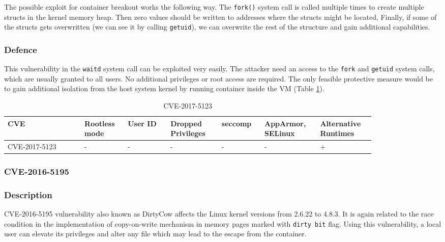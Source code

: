 The possible exploit for container breakout works the following way. The \texttt{fork()} system call is called multiple times to create multiple structs in the kernel memory heap. Then zero values should be written to addresses where the structs might be located, Finally, if some of the structs gets overwritten (we can see it by calling \texttt{getuid}), we can overwrite the rest of the structure and gain additional capabilities.

\subsubsection*{Defence}

This vulnerability in the \texttt{waitd} system call can be exploited very easily. The attacker need an access to the \texttt{fork} and \texttt{getuid} system calls, which are usually granted to all users. No additional privileges or root access are required. The only feasible protective measure would be to gain additional isolation from the host system kernel by running container inside the VM (Table \ref{tab:h:8}).

\begin{table}[H]
    \centering \small
    \begin{tabular}{| p{0.18\linewidth} | p{0.1\linewidth} | p{0.1\linewidth} | p{0.12\linewidth} | p{0.1\linewidth} | p{0.12\linewidth} | p{0.12\linewidth} |} \hline
    CVE & Rootless mode & User ID & Dropped Privileges & seccomp & AppArmor, SELinux & Alternative Runtimes \\ \hline
    CVE-2017-5123 & - & - & - & - & - & \cellcolor{green!25} + \\ \hline
    \end{tabular}
    \caption{CVE-2017-5123}
    \label{tab:h:8}
\end{table}


\subsubsection{CVE-2016-5195}
\subsubsection*{Description}

CVE-2016-5195 vulnerability also known as DirtyCow affects the Linux kernel versions from 2.6.22 to 4.8.3. It is again related to the race condition in the implementation of copy-on-write mechanism in memory pages marked with \texttt{dirty bit} flag. Using this vulnerability, a local user can elevate its privileges and alter any file which may lead to the escape from the container.

